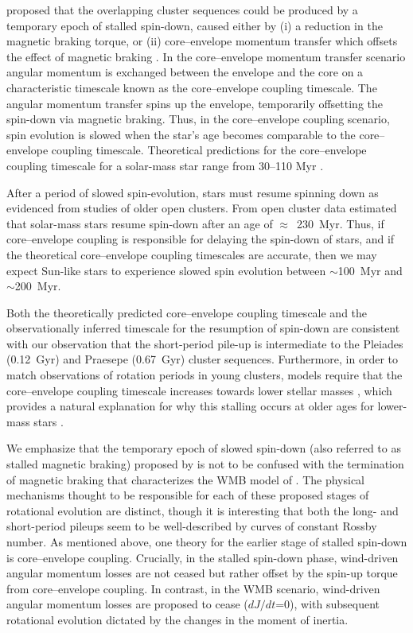 \documentclass[trackchanges,twocolumn]{aastex631}
\begin{document}
\citet{Curtis2019a, Curtis2020} proposed that the overlapping cluster sequences could be produced by a temporary epoch of stalled spin-down, caused either by (i) a reduction in the magnetic braking torque, or (ii) core–envelope momentum transfer which offsets the effect of magnetic braking \citep[e.g.][]{MacGregor1991}. In the core–envelope momentum transfer scenario angular momentum is exchanged between the envelope and the core on a characteristic timescale known as the core–envelope coupling timescale. The angular momentum transfer spins up the envelope, temporarily offsetting the spin-down via magnetic braking. Thus, in the core–envelope coupling scenario, spin evolution is slowed when the star's age becomes comparable to the core–envelope coupling timescale. Theoretical predictions for the core–envelope coupling timescale for a solar-mass star range from 30--110 Myr \citep{MacGregor1991,Krishnamurthi1997, Bouvier2008, IrwinBouvier2009, Denissenkov2010, GalletBouvier2015, Lanzafame2015, Somers2016, Spada2020}. 

After a period of slowed spin-evolution, stars must resume spinning down as evidenced from studies of older open clusters. From open cluster data \citet{Curtis2020} estimated that solar-mass stars resume spin-down after an age of $\approx$~230~Myr. Thus, if core–envelope coupling is responsible for delaying the spin-down of stars, and if the theoretical core–envelope coupling timescales are accurate, then we may expect Sun-like stars to experience slowed spin evolution between $\sim$100~Myr and $\sim$200~Myr. 

Both the theoretically predicted core–envelope coupling timescale and the observationally inferred timescale for the resumption of spin-down are consistent with our observation that the short-period pile-up is intermediate to the Pleiades (0.12~Gyr) and Praesepe (0.67~Gyr) cluster sequences. Furthermore, in order to match observations of rotation periods in young clusters, models require that the core–envelope coupling timescale increases towards lower stellar masses \citep[e.g.][]{Irwin2007, Denissenkov2010, GalletBouvier2015}, which provides a natural explanation for why this stalling occurs at older ages for lower-mass stars \citep{Curtis2020}. 

We emphasize that the temporary epoch of slowed spin-down (also referred to as stalled magnetic braking) proposed by \citet{Curtis2019a, Curtis2020} is not to be confused with the termination of magnetic braking that characterizes the WMB model of \citet{vanSaders2016, vanSaders2019}. The physical mechanisms thought to be responsible for each of these proposed stages of rotational evolution are distinct, though it is interesting that both the long- and short-period pileups seem to be well-described by curves of constant Rossby number. As mentioned above, one theory for the earlier stage of stalled spin-down is core–envelope coupling. Crucially, in the stalled spin-down phase, wind-driven angular momentum losses are not ceased but rather offset by the spin-up torque from core–envelope coupling. In contrast, in the WMB scenario, wind-driven angular momentum losses are proposed to cease ($dJ/dt$=0), with subsequent rotational evolution dictated by the changes in the moment of inertia. 
\end{document}
